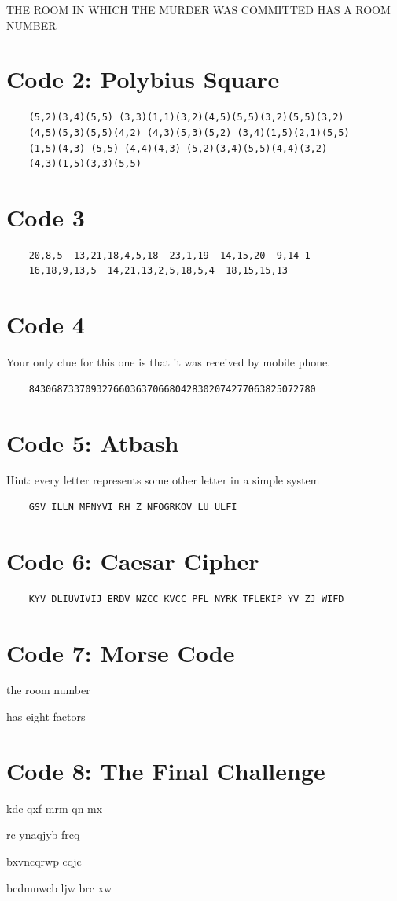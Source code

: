 \documentclass[11pt,a4paper]{report}
\def\lm{\Large\morse}
\begin{document}

{\pigpenfont THE ROOM IN WHICH THE MURDER WAS COMMITTED HAS A ROOM NUMBER}

\section*{Code 2: Polybius Square}

\begin{verbatim}
    (5,2)(3,4)(5,5) (3,3)(1,1)(3,2)(4,5)(5,5)(3,2)(5,5)(3,2) 
    (4,5)(5,3)(5,5)(4,2) (4,3)(5,3)(5,2) (3,4)(1,5)(2,1)(5,5) 
    (1,5)(4,3) (5,5) (4,4)(4,3) (5,2)(3,4)(5,5)(4,4)(3,2) 
    (4,3)(1,5)(3,3)(5,5)
\end{verbatim}

\section*{Code 3}
\begin{verbatim}
    20,8,5  13,21,18,4,5,18  23,1,19  14,15,20  9,14 1 
    16,18,9,13,5  14,21,13,2,5,18,5,4  18,15,15,13
\end{verbatim}

\section*{Code 4}
Your only clue for this one is that it was received by mobile phone.


\begin{verbatim}
    843068733709327660363706680428302074277063825072780
\end{verbatim}

\section*{Code 5: Atbash}
Hint: every letter represents some other letter in a simple system

\begin{verbatim}
    GSV ILLN MFNYVI RH Z NFOGRKOV LU ULFI
\end{verbatim}

\section*{Code 6: Caesar Cipher}

\begin{verbatim}
    KYV DLIUVIVIJ ERDV NZCC KVCC PFL NYRK TFLEKIP YV ZJ WIFD
\end{verbatim}

\section*{Code 7: Morse Code}

{\lm the room number}

{\lm has eight factors}

\section*{Code 8: The Final Challenge}

{\lm kdc qxf mrm qn mx } 

{\lm rc ynaqjyb frcq }

{\lm bxvncqrwp cqjc}

{\lm  bcdmnwcb ljw brc xw}
\end{document}
